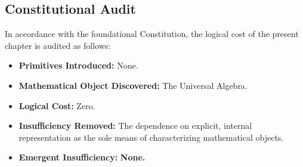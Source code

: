 \documentclass[12pt,anyside]{book}
\begin{document}
\subsection{Constitutional Audit}
In accordance with the foundational Constitution, the logical cost of the present chapter is audited as follows:
\begin{itemize}
    \item \textbf{Primitives Introduced:} None.
    \item \textbf{Mathematical Object Discovered:} The Universal Algebra.
    \item \textbf{Logical Cost:} Zero.
    \item \textbf{Insufficiency Removed:} The dependence on explicit, internal representation as the sole means of characterizing mathematical objects.
    \item \textbf{Emergent Insufficiency:} \textbf{None.}
\end{itemize}
\end{document}
